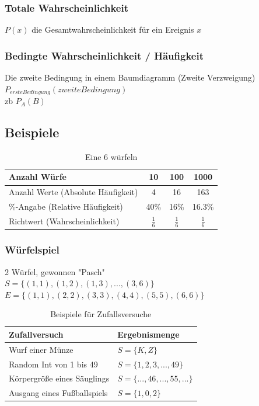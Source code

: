 \documentclass[a4paper,12pt]{article}
\begin{document}
\subsubsection{Totale Wahrscheinlichkeit}
$P(x)$ die Gesamtwahrscheinlichkeit für ein Ereignis $x$
\subsubsection{Bedingte Wahrscheinlichkeit / Häufigkeit}
Die zweite Bedingung in einem Baumdiagramm (Zweite Verzweigung)\\
$P_{ersteBedingung}(zweiteBedingung)$\\
zb $P_A(B)$
\subsection{Beispiele}
\begin{table}[h!]
  \begin{center}
    \caption{Eine 6 würfeln}
    \label{tab:table1}
    \begin{tabular}{l|c|c|c} %
      \textbf{Anzahl Würfe} & \textbf{10} & \textbf{100} & \textbf{1000}\\
      \hline
      Anzahl Werte (Absolute Häufigkeit) & 4 & 16 & 163\\
      \hline
      \%-Angabe (Relative Häufigkeit) & 40\% & 16\% & 16.3\%\\
      \hline
      Richtwert (Wahrscheinlichkeit) & $\frac{1}{6}$ & $\frac{1}{6}$ & $\frac{1}{6}$\\
    \end{tabular}
  \end{center}
\end{table}
\pagebreak
\subsubsection*{Würfelspiel}
2 Würfel, gewonnen "Pasch"\\
$S = \Big\{(1,1),(1,2),(1,3),...,(3,6)\Big\}$\\
$E = \Big\{(1,1),(2,2),(3,3),(4,4),(5,5),(6,6)\Big\}$\\
\begin{table}[h!]
  \begin{center}
    \caption{Beispiele für Zufallsversuche}
    \label{tab:table1}
    \begin{tabular}{l|l} %
      \textbf{Zufallversuch} & \textbf{Ergebnismenge}\\
      \hline
      Wurf einer Münze & $S = \{K,Z\}$\\
      \hline
      Random Int von 1 bis 49 & $S = \{1,2,3,...,49\}$\\
      \hline
      Körpergröße eines Säuglings & $S = \{...,46,...,55,...\}$\\
      \hline
      Ausgang eines Fußballspiels & $S = \{1,0,2\}$
    \end{tabular}
  \end{center}
\end{table}
\end{document}
